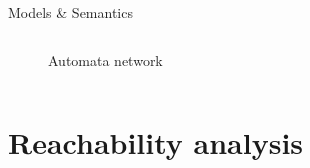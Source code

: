 \documentclass[8pt]{beamer}
\begin{document}
\begin{frame}{Models \& Semantics}
\begin{columns}
\begin{column}{.5\textwidth}
\begin{figure}

    \caption{Automata network}
\end{figure}

\end{column}
\end{columns}

\end{frame}

\section{Reachability analysis}
\end{document}
